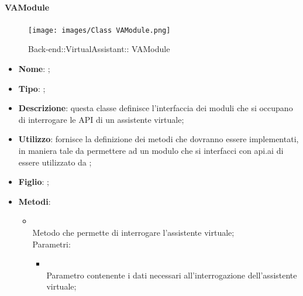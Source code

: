 \hypertarget{ VAModule_label}{\paragraph{ VAModule}}
\begin{figure}[h]
	\centering
	\texttt{[image: images/Class VAModule.png]}
	\caption{Back-end::VirtualAssistant:: VAModule}
\end{figure}
\begin{itemize}
	\item \textbf{Nome}: ;
	\item \textbf{Tipo}: ;
	\item \textbf{Descrizione}: questa classe definisce l'interfaccia dei moduli che si occupano di interrogare le API di un assistente virtuale;
	\item \textbf{Utilizzo}: fornisce la definizione dei metodi che dovranno essere implementati, in maniera tale da permettere ad un modulo che si interfacci con api.ai di essere utilizzato da ;
	\item \textbf{Figlio}: ;
	\item \textbf{Metodi}:
	\begin{itemize}
		\item[]  \\
		Metodo che permette di interrogare l'assistente virtuale;\\
		Parametri:
		\begin{itemize}
			\item {} \\
			Parametro contenente i dati necessari all'interrogazione dell'assistente virtuale;
		\end{itemize}
	\end{itemize}
\end{itemize}

